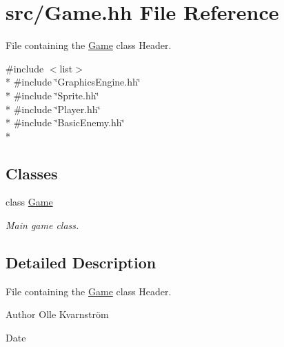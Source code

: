 \hypertarget{Game_8hh}{\section{src/\-Game.hh File Reference}
\label{Game_8hh}
}


File containing the \hyperlink{classGame}{Game} class Header.  


{\ttfamily \#include $<$list$>$}\\*
{\ttfamily \#include \char`\"{}Graphics\-Engine.\-hh\char`\"{}}\\*
{\ttfamily \#include \char`\"{}Sprite.\-hh\char`\"{}}\\*
{\ttfamily \#include \char`\"{}Player.\-hh\char`\"{}}\\*
{\ttfamily \#include \char`\"{}Basic\-Enemy.\-hh\char`\"{}}\\*
\subsection*{Classes}
\begin{DoxyCompactItemize}
\item 
class \hyperlink{classGame}{Game}
\begin{DoxyCompactList}\small\item\em Main game class. \end{DoxyCompactList}\end{DoxyCompactItemize}


\subsection{Detailed Description}
File containing the \hyperlink{classGame}{Game} class Header. \begin{DoxyAuthor}{Author}
Olle Kvarnström 
\end{DoxyAuthor}
\begin{DoxyDate}{Date}

\end{DoxyDate}

